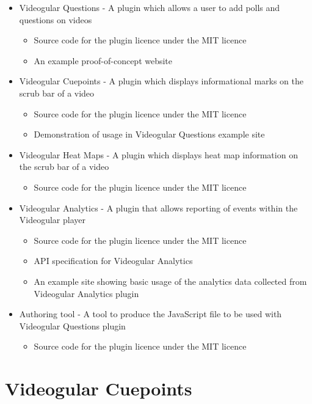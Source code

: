 \documentclass[12pt,a4paper]{article}
\begin{document}
\begin{itemize}
\item Videogular Questions - A plugin which allows a user to add polls and questions on videos
	\begin{itemize}
	\item Source code for the plugin licence under the MIT licence
	\item An example proof-of-concept website
	\end{itemize}
	
\item Videogular Cuepoints - A plugin which displays informational marks on the scrub bar of a video
	\begin{itemize}
	\item Source code for the plugin licence under the MIT licence
	\item Demonstration of usage in Videogular Questions example site
	\end{itemize}
	
\item Videogular Heat Maps - A plugin which displays heat map information on the scrub bar of a video
	\begin{itemize}
	\item Source code for the plugin licence under the MIT licence
	\end{itemize}
	
\item Videogular Analytics - A plugin that allows reporting of events within the Videogular player
	\begin{itemize}
	\item Source code for the plugin licence under the MIT licence
	\item API specification for Videogular Analytics
	\item An example site showing basic usage of the analytics data collected from Videogular Analytics plugin
	\end{itemize}
	
\item Authoring tool - A tool to produce the JavaScript file to be used with Videogular Questions plugin
	\begin{itemize}
	\item Source code for the plugin licence under the MIT licence
	\end{itemize}
\end{itemize}

\section*{Videogular Cuepoints}
\end{document}
